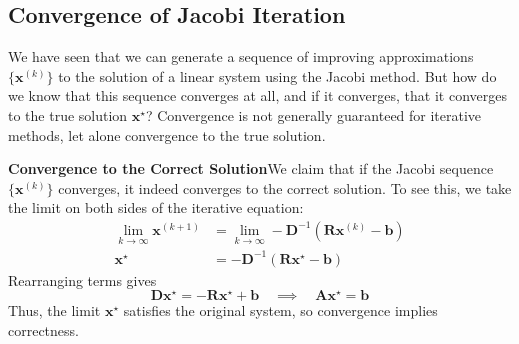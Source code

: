 \subsection{Convergence of Jacobi Iteration}
We have seen that we can generate a sequence of improving approximations $\{\mathbf{x}^{(k)}\}$ to the solution of a linear system using the Jacobi method. But how do we know that this sequence converges at all, and if it converges, that it converges to the true solution $\mathbf{x}^\star$? Convergence is not generally guaranteed for iterative methods, let alone convergence to the true solution.

\textbf{Convergence to the Correct Solution}\quad We claim that if the Jacobi sequence $\{\mathbf{x}^{(k)}\}$ converges, it indeed converges to the correct solution. To see this, we take the limit on both sides of the iterative equation:
\begin{align*}
    \lim_{k \to \infty} \mathbf{x}^{(k+1)} & = \lim_{k \to \infty} -\mathbf{D}^{-1}(\mathbf{R}\mathbf{x}^{(k)} - \mathbf{b}) \\
    \mathbf{x}^\star &= -\mathbf{D}^{-1}(\mathbf{R}\mathbf{x}^\star - \mathbf{b})
\end{align*}
Rearranging terms gives
\begin{equation*}
    \mathbf{D}\mathbf{x}^\star = -\mathbf{R}\mathbf{x}^\star + \mathbf{b} 
    \quad \implies \quad 
    \mathbf{A}\mathbf{x}^\star = \mathbf{b}
\end{equation*}
Thus, the limit $\mathbf{x}^\star$ satisfies the original system, so convergence implies correctness.

